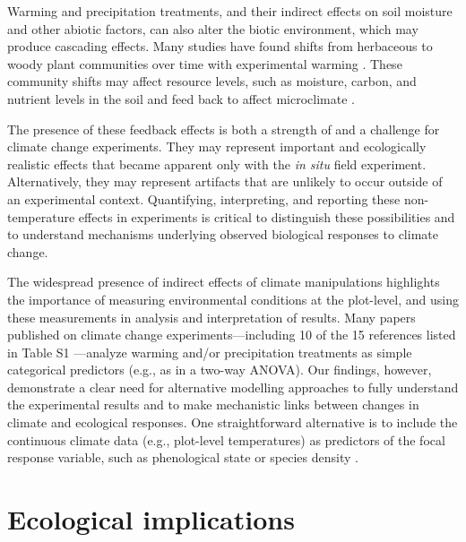 \documentclass{article}
\begin{document}
\par Warming and precipitation treatments, and their indirect effects on soil moisture and other abiotic factors, can also alter the biotic environment, which may produce cascading effects. Many studies have found shifts from herbaceous to woody plant communities over time with experimental warming \citep[e.g.,][]{rollinson2012, mcdaniel2014,mcdaniel2014b, harte2015}. These community shifts may affect resource levels, such as moisture, carbon, and nutrient levels in the soil \citep{mcdaniel2014,mcdaniel2014b, harte2015} and feed back to affect microclimate \citep{harte2015}. 
\par The presence of these feedback effects is both a strength of and a challenge for climate change experiments. They may represent important and ecologically realistic effects that became apparent only with the \emph{in situ} field experiment. Alternatively, they may represent artifacts that are unlikely to occur outside of an experimental context. Quantifying, interpreting, and reporting these non-temperature effects in experiments is critical to distinguish these possibilities and to understand mechanisms underlying observed biological responses to climate change. 

\par The widespread presence of indirect effects of climate manipulations highlights the importance of measuring environmental conditions at the plot-level, and using these measurements in analysis and interpretation of results. Many papers published on climate change experiments---including 10 of the 15 references listed in Table S1
---analyze warming and/or precipitation treatments as simple categorical predictors (e.g., as in a two-way ANOVA). Our findings, however, demonstrate a clear need for alternative modelling approaches to fully understand the experimental results and to make mechanistic links between changes in climate and ecological responses. One straightforward alternative is to include the continuous climate data (e.g., plot-level temperatures) as predictors of the focal response variable, such as phenological state or species density \citep [e.g.,][]{marchin2015, pelini2014}.

\section* {Ecological implications}
\end{document}
